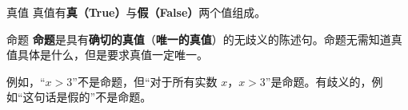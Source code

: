 
\begin{definition}{真值}
真值有\textbf{真（True）}与\textbf{假（False）}两个值组成。
\end{definition}

\begin{definition}{命题}
\textbf{命题}是具有\textbf{确切的真值}（\textbf{唯一的真值}）的无歧义的陈述句。命题无需知道真值具体是什么，但是要求真值一定唯一。
\end{definition}
例如，“$x>3$”不是命题，但“对于所有实数 $x$，$x>3$”是命题。有歧义的，例如“这句话是假的”不是命题。